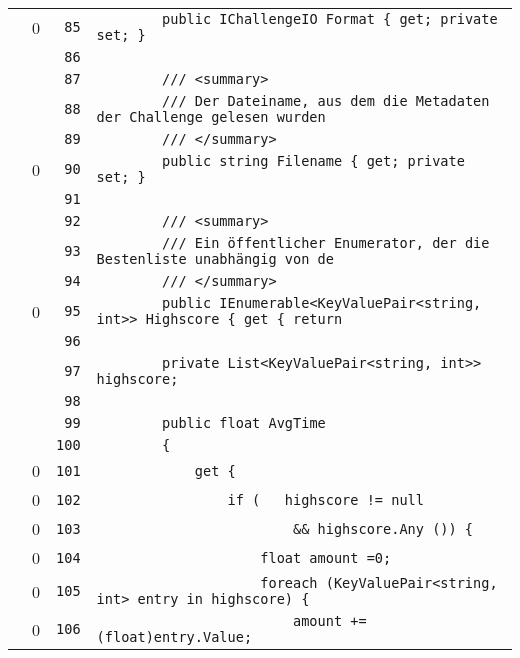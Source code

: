 \documentclass[a4paper,10pt]{article}
\begin{document}
\begin{longtable}[l]{lrrl}
\cellcolor{red} & 0 & \verb~85~ & \verb~        public IChallengeIO Format { get; private set; }~\\
\cellcolor{gray} &  & \verb~86~ & \verb~~\\
\cellcolor{gray} &  & \verb~87~ & \verb~        /// <summary>~\\
\cellcolor{gray} &  & \verb~88~ & \verb~        /// Der Dateiname, aus dem die Metadaten der Challenge gelesen wurden ~\\
\cellcolor{gray} &  & \verb~89~ & \verb~        /// </summary>~\\
\cellcolor{red} & 0 & \verb~90~ & \verb~        public string Filename { get; private set; }~\\
\cellcolor{gray} &  & \verb~91~ & \verb~~\\
\cellcolor{gray} &  & \verb~92~ & \verb~        /// <summary>~\\
\cellcolor{gray} &  & \verb~93~ & \verb~        /// Ein öffentlicher Enumerator, der die Bestenliste unabhängig von de~\\
\cellcolor{gray} &  & \verb~94~ & \verb~        /// </summary>~\\
\cellcolor{red} & 0 & \verb~95~ & \verb~        public IEnumerable<KeyValuePair<string, int>> Highscore { get { return~\\
\cellcolor{gray} &  & \verb~96~ & \verb~~\\
\cellcolor{gray} &  & \verb~97~ & \verb~        private List<KeyValuePair<string, int>> highscore;~\\
\cellcolor{gray} &  & \verb~98~ & \verb~~\\
\cellcolor{gray} &  & \verb~99~ & \verb~        public float AvgTime~\\
\cellcolor{gray} &  & \verb~100~ & \verb~        {~\\
\cellcolor{red} & 0 & \verb~101~ & \verb~            get {~\\
\cellcolor{red} & 0 & \verb~102~ & \verb~                if (   highscore != null~\\
\cellcolor{red} & 0 & \verb~103~ & \verb~                        && highscore.Any ()) {~\\
\cellcolor{red} & 0 & \verb~104~ & \verb~                    float amount =0;~\\
\cellcolor{red} & 0 & \verb~105~ & \verb~                    foreach (KeyValuePair<string, int> entry in highscore) {~\\
\cellcolor{red} & 0 & \verb~106~ & \verb~                        amount += (float)entry.Value;~\\

\end{longtable}
\end{document}
